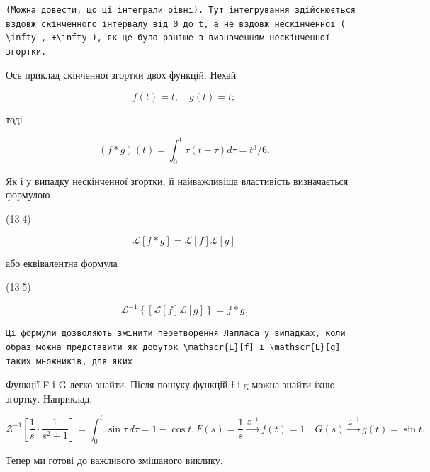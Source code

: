 \documentclass[
  ukrainian,
]{article}
\begin{document}
\begin{verbatim}
(Можна довести, що ці інтеграли рівні). Тут інтегрування здійснюється вздовж скінченного інтервалу від 0 до t, а не вздовж нескінченної ( \infty , +\infty ), як це було раніше з визначенням нескінченної згортки.
\end{verbatim}

Ось приклад скінченної згортки двох функцій. Нехай

\[
f(t) = t, \quad g(t) = t;
\]

тоді

\[
(f * g)(t) = \int_{0}^{t} \tau(t - \tau) d\tau = t^{3}/6.
\]

Як і у випадку нескінченної згортки, її найважливіша властивість
визначається формулою

(13.4)

\[
\mathscr{L}[f * g] = \mathscr{L}[f] \mathscr{L}[g]
\]

або еквівалентна формула

(13.5)

\[
\mathscr{L}^{-1}\left\{ \left[\mathscr{L}\left[f\right]\mathscr{L}\left[g\right]\right\} = f*g. \right.
\]

\begin{verbatim}
Ці формули дозволяють змінити перетворення Лапласа у випадках, коли образ можна представити як добуток \mathscr{L}[f] і \mathscr{L}[g] таких множників, для яких
\end{verbatim}

Функції F і G легко знайти. Після пошуку функцій f і g можна знайти їхню
згортку. Наприклад,

\[
\mathcal{Z}^{-1}\left[\frac{1}{s} \cdot \frac{1}{s^2+1}\right] = \int_0^t \sin \tau \, d\tau = 1 - \cos t,
F(s) = \frac{1}{s} \xrightarrow{\mathcal{Z}^{-1}} f(t) = 1 \quad G(s) \xrightarrow{\mathcal{Z}^{-1}} g(t) = \sin t.
\]

Тепер ми готові до важливого змішаного виклику.
\end{document}
